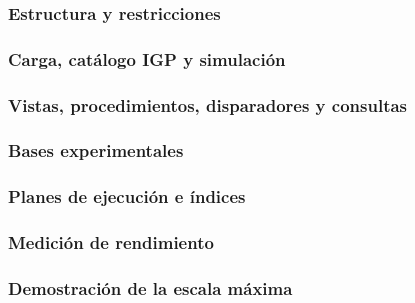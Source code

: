 \documentclass[12pt,a4paper]{article}
\begin{document}
\begingroup
\setlength{\parskip}{0.25em}

\subsubsection{Estructura y restricciones}


\subsubsection{Carga, catálogo IGP y simulación}


\subsubsection{Vistas, procedimientos, disparadores y consultas}


\subsubsection{Bases experimentales}


\subsubsection{Planes de ejecución e índices}


\subsubsection{Medición de rendimiento}


\subsubsection{Demostración de la escala máxima}


\endgroup
\end{document}
